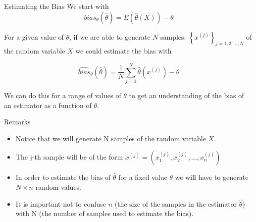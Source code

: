 \documentclass[8pt]{beamer}
\begin{document}
\begin{frame}{Estimating the Bias}
We start with
\begin{equation*}
	bias_{\theta}(\hat{\theta})=E(\hat{\theta}(X))-\theta
\end{equation*}

For a given value of $\theta$, if we are able to generate $N$ samples: $\left\{x^{(j)}\right\}_{j=1,2,...,N}$ of the random variable $X$ we could estimate the bias with

\begin{equation*}
	\widehat{bias}_{\theta}\left(\hat{\theta}\right)=\frac{1}{N} \sum_{j=1}^N \hat{\theta}\left(x^{(j)}\right)-\theta
\end{equation*}

We can do this for a range of values of $\theta$ to get an understanding of the bias of an estimator as a function of $\theta$. 
\end{frame}

\begin{frame}{Remarks}
\begin{itemize}
	\item Notice that we will generate N samples of the random variable $X$.
	\item The j-th sample will be of the form $x^{(j)}=\left(x_1^{(j)},x_2^{(j)},...,x_n^{(j)}\right)$
	\item In order to estimate the bias of $\hat{\theta}$ for a fixed value $\theta$ we will have to generate $N\times n$ random values.
	\item It is important not to confuse $n$ (the size of the samples in the estimator $\hat{\theta}$) with N (the number of samples used to estimate the bias).
\end{itemize}
\end{frame}
\end{document}
